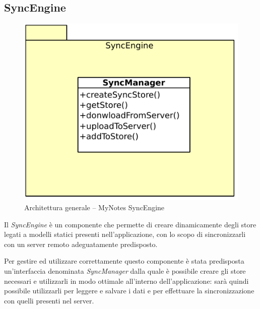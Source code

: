 \subsection{SyncEngine}
\begin{figure}[htb]
\centering
\includegraphics[scale=0.6]{gfx/class/SyncEngine.pdf}
\caption{Architettura generale -- MyNotes SyncEngine}
\label{fig:architettura MyNotes SyncEngine}
\end{figure}
Il \emph{SyncEngine} è un componente che permette di creare dinamicamente degli store legati a modelli statici presenti nell'applicazione, con lo scopo di sincronizzarli con un server remoto adeguatamente predisposto.

Per gestire ed utilizzare correttamente questo componente è stata predisposta un'interfaccia denominata \emph{SyncManager} dalla quale è possibile creare gli store necessari e utilizzarli in modo ottimale all'interno dell'applicazione: sarà quindi possibile utilizzarli per leggere e salvare i dati e per effettuare la sincronizzazione con quelli presenti nel server.


